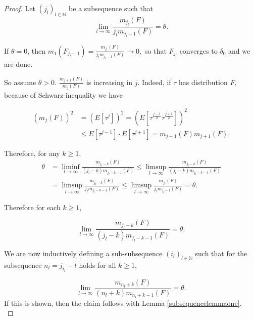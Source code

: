 \documentclass[12pt,a4paper]{scrartcl}
\numberwithin{equation}{section}
\newcommand{\N}{\mathbb{N}} %
\begin{document}
\begin{proof}
Let $\left(j_l\right)_{l \in \N}$ be a subsequence such that
\begin{equation}
\lim_{l \to \infty} \frac{m_{j_l}\left(F\right)}{j_l m_{j_l-1}\left(F\right)} = \theta.
\end{equation}

If $ \theta = 0 $, then $ m_1\left(F_{j_l-1}\right) = \frac{m_{j_l}\left(F\right)}{j_l m_{j_l-1}\left(F\right)} \to 0, $ so that $F_{j_l}$ converges to $\delta_0$ and we are done.

So assume $ \theta > 0.$
$\frac{m_{j+1}\left(F\right)}{m_{j}\left(F\right)} $ is increasing in $j.$ Indeed, if $\tau$ has distribution $F,$ because of Schwarz-inequality we have

\begin{align*}
\left(m_j\left(F\right)\right)^2 &= \left(E\left[\tau^j\right]\right)^2 = \left(E\left[\tau^{\frac{j-1}{2}} \tau^{\frac{j+1}{2}}\right]\right)^2 \\
& \leq E\left[\tau^{j-1}\right] \cdot E\left[\tau^{j+1}\right] = m_{j-1}\left(F\right) m_{j+1}\left(F\right).
\end{align*}

Therefore, for any $k \geq 1$,
\begin{align*}
\theta &= \liminf_{l \to \infty} \frac{m_{j_l-k}\left(F\right)}{\left(j_l-k\right) m_{j_l-k-1}\left(F\right)} \leq \limsup_{l \to \infty} \frac{m_{j_l-k}\left(F\right)}{\left(j_l-k\right) m_{j_l-k-1}\left(F\right)} \\
& = \limsup_{l \to \infty} \frac{m_{j_l-k}\left(F\right)}{j_l m_{j_l-k-1}\left(F\right)} \leq \limsup_{l \to \infty} \frac{m_{j_l}\left(F\right)}{j_l m_{j_l-1}\left(F\right)} = \theta.
\end{align*}

Therefore for each $ k \geq 1 $,

\begin{equation}
\label{eq:diagonalargument}
\lim_{l \to \infty} \frac{m_{j_l-k}\left(F\right)}{\left(j_l-k\right) m_{j_l-k-1}\left(F\right)} = \theta.
\end{equation}

We are now inductively defining a sub-subsequence $ \left(i_l\right)_{l \in \N}$ such that for the subsequence $n_l = j_{i_l} - l$ holds for all $k \geq 1$,

\begin{equation}
\lim_{l \to \infty} \frac{m_{n_l+k}\left(F\right)}{\left(n_l+k\right) m_{n_l+k-1}\left(F\right)} = \theta.
\end{equation}
If this is shown, then the claim follows with Lemma \ref{subsequencelemmaone}. \\[1ex]


\end{proof}
\end{document}
